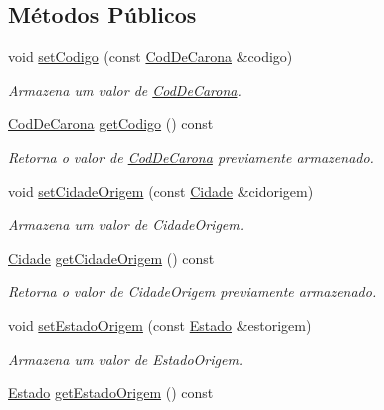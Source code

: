 \subsection*{Métodos Públicos}
\begin{DoxyCompactItemize}
\item 
void \hyperlink{classshibarides_1_1Carona_a4c92ff9279cf52a428b8ff25e6a132db}{set\+Codigo} (const \hyperlink{classshibarides_1_1CodDeCarona}{Cod\+De\+Carona} \&codigo)
\begin{DoxyCompactList}\small\item\em Armazena um valor de \hyperlink{classshibarides_1_1CodDeCarona}{Cod\+De\+Carona}. \end{DoxyCompactList}\item 
\hyperlink{classshibarides_1_1CodDeCarona}{Cod\+De\+Carona} \hyperlink{classshibarides_1_1Carona_aaf5471db61f27b78a13798003f12439c}{get\+Codigo} () const 
\begin{DoxyCompactList}\small\item\em Retorna o valor de \hyperlink{classshibarides_1_1CodDeCarona}{Cod\+De\+Carona} previamente armazenado. \end{DoxyCompactList}\item 
void \hyperlink{classshibarides_1_1Carona_a4a47c7f3210c4e9c2d4c380bd6c66682}{set\+Cidade\+Origem} (const \hyperlink{classshibarides_1_1Cidade}{Cidade} \&cidorigem)
\begin{DoxyCompactList}\small\item\em Armazena um valor de Cidade\+Origem. \end{DoxyCompactList}\item 
\hyperlink{classshibarides_1_1Cidade}{Cidade} \hyperlink{classshibarides_1_1Carona_a01e2983cc1cf3cb30b550d8a38a7a8e1}{get\+Cidade\+Origem} () const 
\begin{DoxyCompactList}\small\item\em Retorna o valor de Cidade\+Origem previamente armazenado. \end{DoxyCompactList}\item 
void \hyperlink{classshibarides_1_1Carona_a72879cb0fe8fa20c740a3069e835571a}{set\+Estado\+Origem} (const \hyperlink{classshibarides_1_1Estado}{Estado} \&estorigem)
\begin{DoxyCompactList}\small\item\em Armazena um valor de Estado\+Origem. \end{DoxyCompactList}\item 
\hyperlink{classshibarides_1_1Estado}{Estado} \hyperlink{classshibarides_1_1Carona_a27959baa3fab1df9ebabd62aaa2865a1}{get\+Estado\+Origem} () const 

\end{DoxyCompactItemize}
